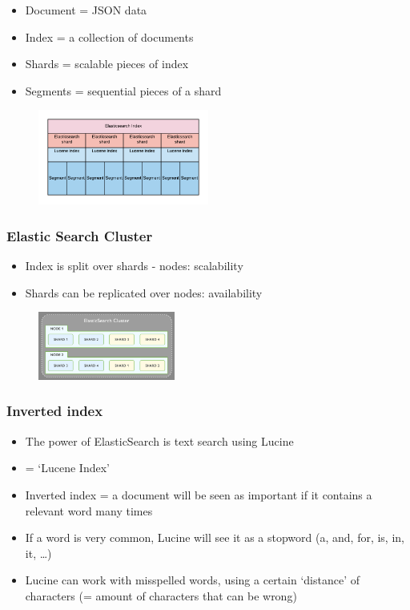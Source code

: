 \documentclass{article}
\begin{document}
\begin{itemize}
    \item Document = JSON data
    \item Index = a collection of documents
    \item Shards = scalable pieces of index
    \item Segments = sequential pieces of a shard
\end{itemize}

\begin{figure}[H]
    \centering
    \includegraphics[width=0.5\textwidth]{elasticsearch-architecture.png}
    \caption{}
\end{figure}

\subsubsection{Elastic Search Cluster}

\begin{itemize}
    \item Index is split over shards - nodes: scalability
    \item Shards can be replicated over nodes: availability
\end{itemize}

\begin{figure}[H]
    \centering
    \includegraphics[width=0.4\textwidth]{elasticsearch-searchcluster.png}
\end{figure}

\subsubsection{Inverted index}

\begin{itemize}
    \item The power of ElasticSearch is text search using Lucine
    \item = `Lucene Index'
    \item Inverted index = a document will be seen as important if it contains a relevant word many times
    \item If a word is very common, Lucine will see it as a stopword (a, and, for, is, in, it, \dots)
    \item Lucine can work with misspelled words, using a certain `distance' of characters (= amount of characters that can be wrong)
\end{itemize}
\end{document}
